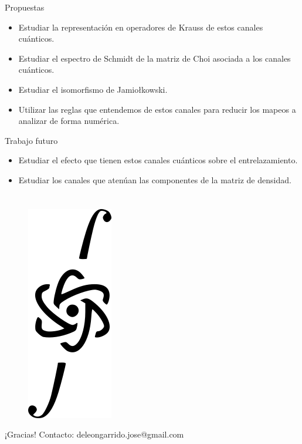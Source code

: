 \documentclass[11pt,xcolor=dvipsnames]{beamer}
\begin{document}
\begin{frame}{Propuestas}
	\begin{itemize}[label=$\textcolor{Blue}{\blacktriangleright}$]
		\item<2-> Estudiar la representación en operadores de Krauss de estos 
					canales cuánticos. 
		\item<3-> Estudiar el espectro de Schmidt de la matriz de Choi asociada 
					a los canales cuánticos.
		\item<4-> Estudiar el isomorfismo de Jamiołkowski.
		\item<5-> Utilizar las reglas que entendemos de estos canales para reducir 
							los mapeos a analizar de forma numérica.
	\end{itemize}
\end{frame}


\begin{frame}{Trabajo futuro}
	\begin{itemize}[label=$\textcolor{Blue}{\blacktriangleright}$]
		\item<2-> Estudiar el efecto que tienen estos canales cuánticos
							sobre el entrelazamiento.
		\item<3-> Estudiar los canales que atenúan las componentes de la matriz de 
							densidad.
	\end{itemize}
\end{frame}


\section{}
\begin{frame}[plain]
	\LARGE
	\centering
	\begin{figure}
		\includegraphics[height=0.5\textheight]{img-congreso/logo-congreso}
	\end{figure}\vfill
	¡Gracias!\vfill
	Contacto: deleongarrido.jose@gmail.com
\end{frame}
\end{document}
